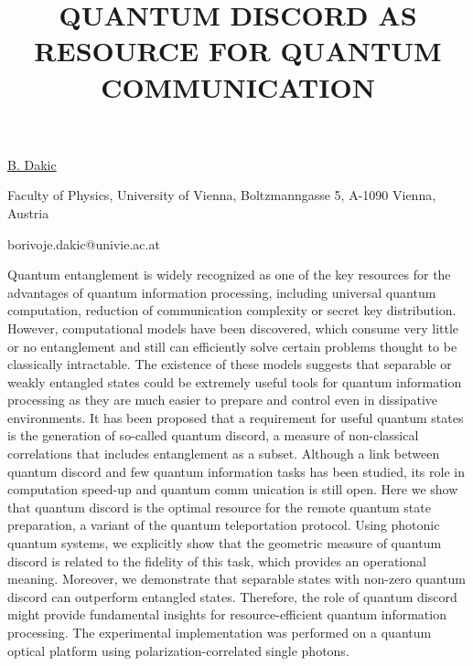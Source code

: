 \title{QUANTUM DISCORD AS RESOURCE FOR QUANTUM COMMUNICATION}

\underline{B. Dakic}

{\normalsize{\vspace{-4mm}
Faculty of Physics,
University of Vienna,
Boltzmanngasse 5,
A-1090 Vienna,
Austria

\email borivoje.dakic@univie.ac.at}}

Quantum entanglement is widely recognized as one of the key resources for the advantages of quantum information processing, including universal quantum computation, reduction of communication complexity or secret key distribution. However, computational models have been discovered, which consume very little or no entanglement and still can efficiently solve certain problems thought to be classically intractable. The existence of these models suggests that separable or weakly entangled states could be extremely useful tools for quantum information processing as they are much easier to prepare and control even in dissipative environments. It has been proposed that a requirement for useful quantum states is the generation of so-called quantum discord, a measure of non-classical correlations that includes entanglement as a subset. Although a link between quantum discord and few quantum information tasks has been studied, its role in computation speed-up and quantum comm
unication is still open. Here we show that quantum discord is the optimal resource for the remote quantum state preparation, a variant of the quantum teleportation protocol. Using photonic quantum systems, we explicitly show that the geometric measure of quantum discord is related to the fidelity of this task, which provides an operational meaning. Moreover, we demonstrate that separable states with non-zero quantum discord can outperform entangled states. Therefore, the role of quantum discord might provide fundamental insights for resource-efficient quantum information processing. The experimental implementation was performed on a quantum optical platform using polarization-correlated single photons.

\vspace{\baselineskip} 
